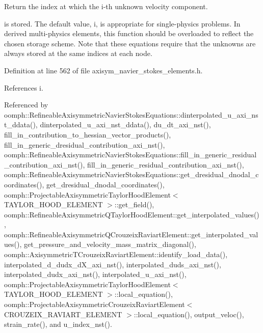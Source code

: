 Return the index at which the i-\/th unknown velocity component. 

is stored. The default value, i, is appropriate for single-\/physics problems. In derived multi-\/physics elements, this function should be overloaded to reflect the chosen storage scheme. Note that these equations require that the unknowns are always stored at the same indices at each node. 

Definition at line 562 of file axisym\+\_\+navier\+\_\+stokes\+\_\+elements.\+h.



References i.



Referenced by oomph\+::\+Refineable\+Axisymmetric\+Navier\+Stokes\+Equations\+::dinterpolated\+\_\+u\+\_\+axi\+\_\+nst\+\_\+ddata(), dinterpolated\+\_\+u\+\_\+axi\+\_\+nst\+\_\+ddata(), du\+\_\+dt\+\_\+axi\+\_\+nst(), fill\+\_\+in\+\_\+contribution\+\_\+to\+\_\+hessian\+\_\+vector\+\_\+products(), fill\+\_\+in\+\_\+generic\+\_\+dresidual\+\_\+contribution\+\_\+axi\+\_\+nst(), oomph\+::\+Refineable\+Axisymmetric\+Navier\+Stokes\+Equations\+::fill\+\_\+in\+\_\+generic\+\_\+residual\+\_\+contribution\+\_\+axi\+\_\+nst(), fill\+\_\+in\+\_\+generic\+\_\+residual\+\_\+contribution\+\_\+axi\+\_\+nst(), oomph\+::\+Refineable\+Axisymmetric\+Navier\+Stokes\+Equations\+::get\+\_\+dresidual\+\_\+dnodal\+\_\+coordinates(), get\+\_\+dresidual\+\_\+dnodal\+\_\+coordinates(), oomph\+::\+Projectable\+Axisymmetric\+Taylor\+Hood\+Element$<$ T\+A\+Y\+L\+O\+R\+\_\+\+H\+O\+O\+D\+\_\+\+E\+L\+E\+M\+E\+N\+T $>$\+::get\+\_\+field(), oomph\+::\+Refineable\+Axisymmetric\+Q\+Taylor\+Hood\+Element\+::get\+\_\+interpolated\+\_\+values(), oomph\+::\+Refineable\+Axisymmetric\+Q\+Crouzeix\+Raviart\+Element\+::get\+\_\+interpolated\+\_\+values(), get\+\_\+pressure\+\_\+and\+\_\+velocity\+\_\+mass\+\_\+matrix\+\_\+diagonal(), oomph\+::\+Axisymmetric\+T\+Crouzeix\+Raviart\+Element\+::identify\+\_\+load\+\_\+data(), interpolated\+\_\+d\+\_\+dudx\+\_\+d\+X\+\_\+axi\+\_\+nst(), interpolated\+\_\+duds\+\_\+axi\+\_\+nst(), interpolated\+\_\+dudx\+\_\+axi\+\_\+nst(), interpolated\+\_\+u\+\_\+axi\+\_\+nst(), oomph\+::\+Projectable\+Axisymmetric\+Taylor\+Hood\+Element$<$ T\+A\+Y\+L\+O\+R\+\_\+\+H\+O\+O\+D\+\_\+\+E\+L\+E\+M\+E\+N\+T $>$\+::local\+\_\+equation(), oomph\+::\+Projectable\+Axisymmetric\+Crouzeix\+Raviart\+Element$<$ C\+R\+O\+U\+Z\+E\+I\+X\+\_\+\+R\+A\+V\+I\+A\+R\+T\+\_\+\+E\+L\+E\+M\+E\+N\+T $>$\+::local\+\_\+equation(), output\+\_\+veloc(), strain\+\_\+rate(), and u\+\_\+index\+\_\+nst().

